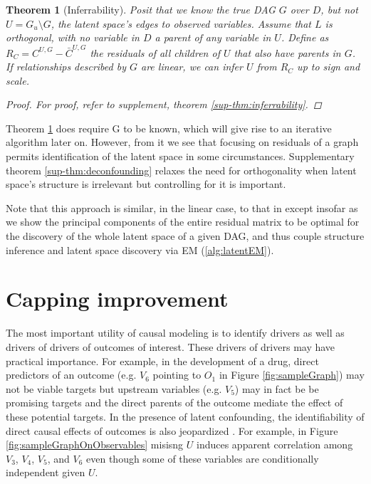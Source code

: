 \documentclass[letterpaper]{article}
\newtheorem{theorem}{Theorem}
\begin{document}
\begin{theorem}[Inferrability]
\label{thm:inferrability}
Posit that we know the true DAG $G$ over $D$, but not $U = G_u \setminus G$, the latent space's edges to observed variables.  Assume that $L$ is orthogonal, with no variable in $D$ a parent of any variable in $U$. Define as $R_C = C^{U,G} - \bar{C}^{U,G}$ the residuals of all children of $U$ that also have parents in $G$.  If relationships described by $G$ are linear, we can infer $U$ from $R_C$ up to sign and scale.  

\begin{proof}
For proof, refer to supplement, theorem \ref{sup-thm:inferrability}.
\end{proof}
\end{theorem}

Theorem \ref{thm:inferrability} does require G to be known, which will give rise to an iterative algorithm later on.  However, from it we see that focusing on residuals of a graph permits identification of the latent space in some circumstances.  Supplementary theorem \ref{sup-thm:deconfounding} relaxes the need for orthogonality when latent space's structure is irrelevant but controlling for it is important.

Note that this approach is similar, in the linear case, to that in \cite{elidan_ideal_2007} except insofar as we show the principal components of the entire residual matrix to be optimal for the discovery of the whole latent space of a given DAG, and thus couple structure inference and latent space discovery via EM (\ref{alg:latentEM}).

\section{Capping improvement}

The most important utility of causal modeling is to identify drivers as well as drivers of drivers of outcomes of interest.  These drivers of drivers may have practical importance. For example, in the development of a drug, direct predictors of an outcome (e.g. $V_6$ pointing to $O_{1}$ in Figure \ref{fig:sampleGraph}) may not be viable targets but upstream variables (e.g. $V_{5}$) may in fact be be promising targets and the direct parents of the outcome mediate the effect of these potential targets. In the presence of latent confounding, the identifiability of direct causal effects of outcomes is also jeopardized \cite{hernan_estimating_2006}.  For example, in Figure \ref{fig:sampleGraphOnObservables} misisng $U$ induces apparent correlation among $V_3$, $V_4$, $V_5$, and $V_6$ even though some of these variables are conditionally independent given $U$.  
\end{document}
